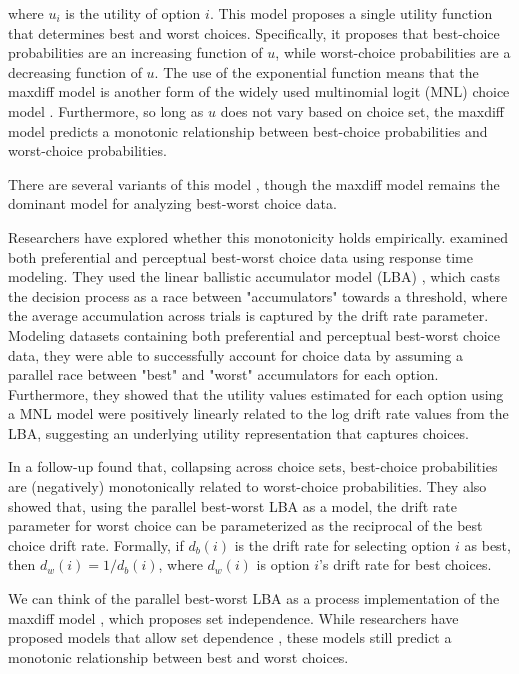 where $u_{i}$ is the utility of option $i$. This model proposes a single utility function that determines best and worst choices. Specifically, it proposes that best-choice probabilities are an increasing function of $u$, while worst-choice probabilities are a decreasing function of $u$. The use of the exponential function means that the maxdiff model is another form of the widely used multinomial logit (MNL) choice model \parencite{hausman1984specification}. Furthermore, so long as $u$ does not vary based on choice set, the maxdiff model predicts a monotonic relationship between best-choice probabilities and worst-choice probabilities.

There are several variants of this model \parencite{marleyProbabilisticModelsBest2005a,marleyProbabilisticModelsSetdependent2008,marleyModelsBestWorst2012,flynnBestWorstScaling2007,flynn2014best}, though the maxdiff model remains the dominant model for analyzing best-worst choice data.

Researchers have explored whether this monotonicity holds empirically. \textcite{hawkinsIntegratingCognitiveProcess2014a} examined both preferential and perceptual best-worst choice data using response time modeling. They used the linear ballistic accumulator model (LBA) \textcite{brownSimplestCompleteModel2008b}, which casts the decision process as a race between "accumulators" towards a threshold, where the average accumulation across trials is captured by the drift rate parameter. Modeling datasets containing both preferential and perceptual best-worst choice data, they were able to successfully account for choice data by assuming a parallel race between "best" and "worst" accumulators for each option. Furthermore, they showed that the utility values estimated for each option using a MNL model were positively linearly related to the log drift rate values from the LBA, suggesting an underlying utility representation that captures choices. 

In a follow-up \textcite{hawkinsBestTimesWorst2014} found that, collapsing across choice sets, best-choice probabilities are (negatively) monotonically related to worst-choice probabilities. They also showed that, using the parallel best-worst LBA as a model, the drift rate parameter for worst choice can be parameterized as the reciprocal of the best choice drift rate. Formally, if $d_{b}(i)$ is the drift rate for selecting option $i$ as best, then $d_{w}(i)=1/d_{b}(i)$, where $d_{w}(i)$ is option $i$'s drift rate for best choices. 

We can think of the parallel best-worst LBA as a process implementation of the maxdiff model \parencite{hawkinsIntegratingCognitiveProcess2014a}, which proposes set independence. While researchers have proposed models that allow set dependence \parencite{marleyProbabilisticModelsSetdependent2008}, these models still predict a monotonic relationship between best and worst choices. 

